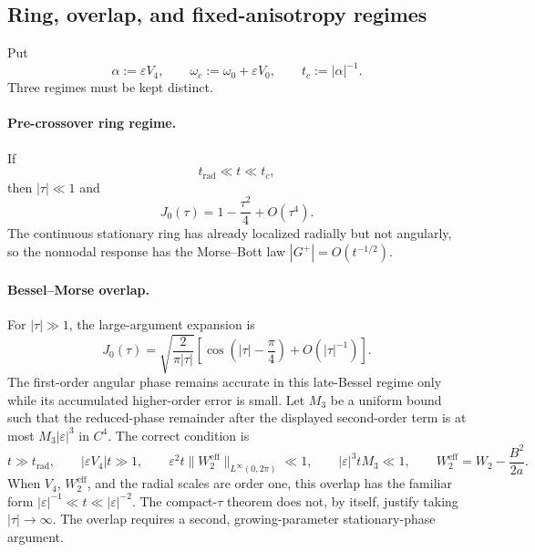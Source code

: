 \subsection{Ring, overlap, and fixed-anisotropy regimes}

Put
\begin{equation}
  \alpha:=\varepsilon V_4,
  \qquad
  \omega_c:=\omega_0+\varepsilon V_0,
  \qquad
  t_c:=|\alpha|^{-1}.
  \label{eq:crossover-scales}
\end{equation}
Three regimes must be kept distinct.

\paragraph{Pre-crossover ring regime.}
If
\begin{equation}
  t_{\mathrm{rad}}\ll t\ll t_c,
  \label{eq:pre-crossover-window}
\end{equation}
then \(|\tau|\ll1\) and
\begin{equation}
  J_0(\tau)=1-\frac{\tau^2}{4}+O(\tau^4).
  \label{eq:small-bessel-expansion}
\end{equation}
The continuous stationary ring has already localized radially but not
angularly, so the nonnodal response has the Morse--Bott law
\(|G^{+}|=O(t^{-1/2})\).

\paragraph{Bessel--Morse overlap.}
For \(|\tau|\gg1\), the large-argument expansion is
\begin{equation}
  J_0(\tau)
  =\sqrt{\frac{2}{\pi|\tau|}}
    \left[
      \cos\left(|\tau|-\frac{\pi}{4}\right)
      +O(|\tau|^{-1})
    \right].
  \label{eq:large-bessel-expansion}
\end{equation}
The first-order angular phase remains accurate in this late-Bessel regime
only while its accumulated higher-order error is small.  Let \(M_3\) be a
uniform bound such that the reduced-phase remainder after the displayed
second-order term is at most \(M_3|\varepsilon|^3\) in \(C^4\).  The correct
condition is
\begin{equation}
  t\gg t_{\mathrm{rad}},
  \qquad
  |\varepsilon V_4|t\gg1,
  \qquad
  \varepsilon^2t
    \lVert W_2^{\mathrm{eff}}\rVert_{L^\infty(0,2\pi)}\ll1,
  \qquad
  |\varepsilon|^3tM_3\ll1,
  \qquad
  W_2^{\mathrm{eff}}=W_2-\frac{B^2}{2a}.
  \label{eq:bessel-morse-overlap-window}
\end{equation}
When \(V_4\), \(W_2^{\mathrm{eff}}\), and the radial scales are order one,
this overlap has the familiar form
\(|\varepsilon|^{-1}\ll t\ll|\varepsilon|^{-2}\).
The compact-\(\tau\) theorem does not, by itself, justify taking
\(|\tau|\to\infty\).  The overlap requires a second, growing-parameter
stationary-phase argument.


